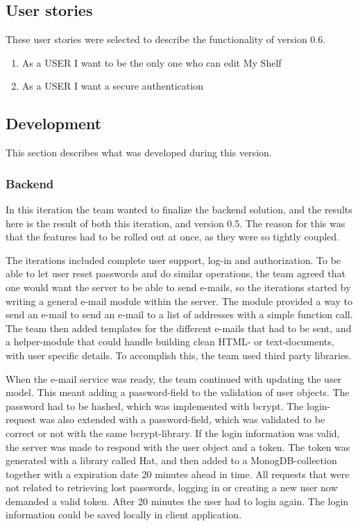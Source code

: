 \subsection{User stories}
\label{user-stories-v6}
These user stories were selected to describe the functionality of version 0.6.
\begin{enumerate}
    \item As a USER I want to be the only one who can edit My Shelf
    \item As a USER I want a secure authentication
\end{enumerate}

\subsection{Development}
This section describes what was developed during this version.

\subsubsection{Backend}
\label{v06-backend}
In this iteration the team wanted to finalize the \gls{backend} solution, and the results here is the result of both this iteration, and version 0.5. The reason for this was that the features had to be rolled out at once, as they were so tightly coupled. 

The iterations included complete user support, log-in and authorization. To be able to let user reset passwords and do similar operations, the team agreed that one would want the server to be able to send e-mails, so the iterations started by writing a general e-mail module within the server. The module provided a way to send an e-mail to send an e-mail to a list of addresses with a simple function call. The team then added templates for the different e-mails that had to be sent, and a helper-module that could handle building clean HTML- or text-documents, with user specific details. To accomplish this, the team used third party libraries. \cite{nodemailer}

When the e-mail service was ready, the team continued with updating the user model. This meant adding a password-field to the validation of user objects. The password had to be hashed, which was implemented with bcrypt. \cite{bcrypt} The login-request was also extended with a password-field, which was validated to be correct or not with the same bcrypt-library. If the login information was valid, the server was made to respond with the user object and a token. The token was generated with a library called Hat, and then added to a MonogDB-collection together with a expiration date 20 minutes ahead in time. \cite{hat} All requests that were not related to retrieving lost passwords, logging in or creating a new user now demanded a valid token. After 20 minutes the user had to login again. The login information could be saved locally in client application.

